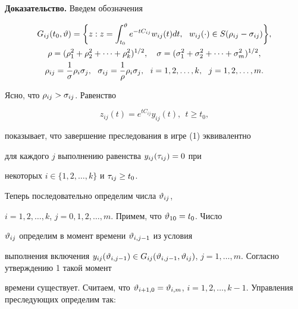{\bf Доказательство.} Введем обозначения


\begin{gather*}


G_{ij}(t_0, \v) = \bigg\{z: z = \int_{t_0}^{\v}e^{-tC_{ij}}w_{ij}(t)dt, \ \


w_{ij}(\cdot) \in S(\rho_{ij} - \s_{ij})\bigg\}, \\


%


\rho = (\rho_1^2 + \rho_2^2 + \dotsb+ \rho_k^2 )^{1/2}, \quad


\s = (\s_1^2 + \s_2^2 + \dotsb + \s_m^2 )^{1/2}, \\


%


\rho_{ij} = \frac{1}{\s}\rho_i \s_j, \ \


\s_{ij} = \frac{1}{\rho}\rho_i \s_j, \ \


i = 1,2,\dotsc,k, \ \ j = 1,2,\dotsc,m.


\end{gather*}





Ясно, что $\rho_{ij} > \sigma_{ij}$. Равенство


$$


z_{ij}(t) = e^{tC_{ij}}y_{ij}(t), \ \ t \geq t_0,


$$


показывает, что завершение преследования в игре (1) эквивалентно


для каждого $j $ выполнению равенства $y_{ij}(\tau_{ij}) = 0 $ при


некоторых $i \in \{1,2,\dotsc,k \} $ и $\tau_{ij} \geq t_0$.





Теперь последовательно определим числа $\vartheta_{ij}$,


$i=1,2,\dotsc,k$, $j=0,1,2,\dotsc,m$. Примем, что $\vartheta_{10} = t_0$. Число


$\vartheta_{ij} $ определим в момент времени $\vartheta_{i,j-1} $ из условия


выполнения включения $y_{ij}(\v_{i,j-1}) \in G_{ij}(\v_{i,j-1},


\v_{ij})$, $j = 1,\dotsc,m$. Согласно утверждению 1 такой момент


времени существует. Считаем, что $\v_{i+1,0} = \v_{i,m}$, $i=1,


2, \dotsc, k-1$. Управления преследующих определим так:


